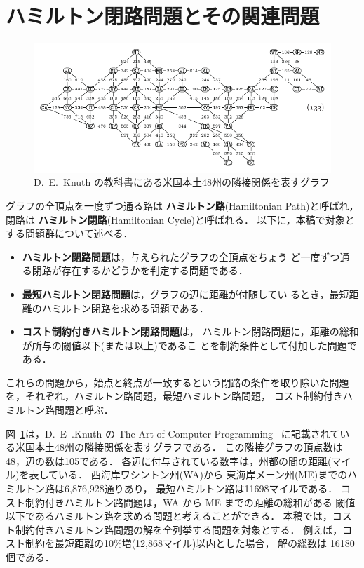 ﻿%
\section{ハミルトン閉路問題とその関連問題}\label{chap:background}

\begin{figure}[t]
  \centering
  \includegraphics[width=0.7\linewidth]{fig/taocp_vol4fasc1b_p52_eq133.pdf}
  \caption{D.~E.~Knuth の教科書にある米国本土48州の隣接関係を表すグラフ}
  \label{fig:USmap}
\end{figure}

グラフの全頂点を一度ずつ通る路は
\textbf{ハミルトン路}(Hamiltonian Path)と呼ばれ，
閉路は
\textbf{ハミルトン閉路}(Hamiltonian Cycle)と呼ばれる．
以下に，本稿で対象とする問題群について述べる．
\begin{itemize}
\item \textbf{ハミルトン閉路問題}は，与えられたグラフの全頂点をちょう
  ど一度ずつ通る閉路が存在するかどうかを判定する問題である．
\item \textbf{最短ハミルトン閉路問題}は，グラフの辺に距離が付随してい
  るとき，最短距離のハミルトン閉路を求める問題である．
\item \textbf{コスト制約付きハミルトン閉路問題}は，
  ハミルトン閉路問題に，距離の総和が所与の閾値以下(または以上)であるこ
  とを制約条件として付加した問題である\cite{comp20:Minato}．
\end{itemize}
これらの問題から，始点と終点が一致するという閉路の条件を取り除いた問題
を，それぞれ，ハミルトン路問題，最短ハミルトン路問題，
コスト制約付きハミルトン路問題と呼ぶ．

図~\ref{fig:USmap}は，D.~E~.Knuth の
The Art of Computer Programming~\cite{Knuth:TAOCP:BDD}
に記載されている米国本土48州の隣接関係を表すグラフである．
この隣接グラフの頂点数は48，辺の数は105である．
各辺に付与されている数字は，州都の間の距離(マイル)を表している．
西海岸ワシントン州(WA)から
東海岸メーン州(ME)までのハミルトン路は6,876,928通りあり，
最短ハミルトン路は11698マイルである．
コスト制約付きハミルトン路問題は，WA から ME までの距離の総和がある
閾値以下であるハミルトン路を求める問題と考えることができる．
本稿では，コスト制約付きハミルトン路問題の解を全列挙する問題を対象とする．
例えば，コスト制約を最短距離の10\%増(12,868マイル)以内とした場合，
解の総数は 16180 個である．

